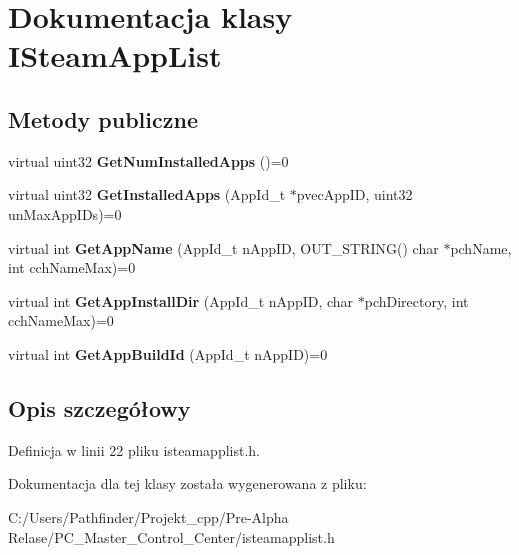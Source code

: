 \hypertarget{class_i_steam_app_list}{}\section{Dokumentacja klasy I\+Steam\+App\+List}
\label{class_i_steam_app_list}
\subsection*{Metody publiczne}
\begin{DoxyCompactItemize}
\item 
\mbox{\label{class_i_steam_app_list_a165e2325d1dd24788f4674a8ac02ec6e}} 
virtual uint32 {\bfseries Get\+Num\+Installed\+Apps} ()=0
\item 
\mbox{\label{class_i_steam_app_list_ac413f953622477697676604c284d2d6a}} 
virtual uint32 {\bfseries Get\+Installed\+Apps} (App\+Id\+\_\+t $\ast$pvec\+App\+ID, uint32 un\+Max\+App\+I\+Ds)=0
\item 
\mbox{\label{class_i_steam_app_list_a4cca3658c277ab4b573cfae62222cd00}} 
virtual int {\bfseries Get\+App\+Name} (App\+Id\+\_\+t n\+App\+ID, O\+U\+T\+\_\+\+S\+T\+R\+I\+NG() char $\ast$pch\+Name, int cch\+Name\+Max)=0
\item 
\mbox{\label{class_i_steam_app_list_a505e71d522ca0a799908f38b27887842}} 
virtual int {\bfseries Get\+App\+Install\+Dir} (App\+Id\+\_\+t n\+App\+ID, char $\ast$pch\+Directory, int cch\+Name\+Max)=0
\item 
\mbox{\label{class_i_steam_app_list_a7528fa95f03c77dccf312bdaf3172475}} 
virtual int {\bfseries Get\+App\+Build\+Id} (App\+Id\+\_\+t n\+App\+ID)=0
\end{DoxyCompactItemize}


\subsection{Opis szczegółowy}


Definicja w linii 22 pliku isteamapplist.\+h.



Dokumentacja dla tej klasy została wygenerowana z pliku\+:\begin{DoxyCompactItemize}
\item 
C\+:/\+Users/\+Pathfinder/\+Projekt\+\_\+cpp/\+Pre-\/\+Alpha Relase/\+P\+C\+\_\+\+Master\+\_\+\+Control\+\_\+\+Center/isteamapplist.\+h\end{DoxyCompactItemize}
